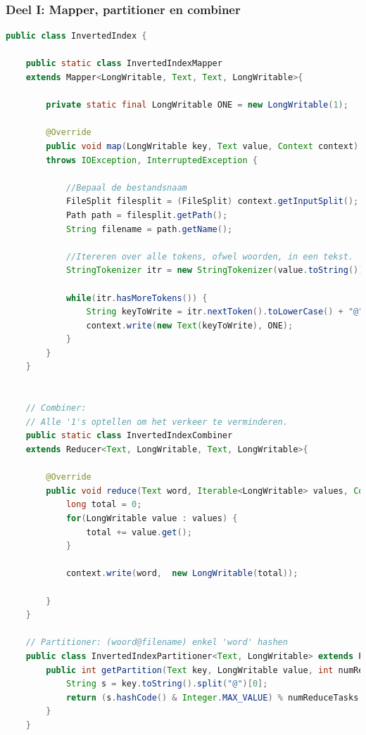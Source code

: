 \documentclass[a4paper,10pt,twoside]{report}
\begin{document}
\subsubsection{Deel I: Mapper, partitioner en combiner}
\begin{lstlisting}[language=Java]
public class InvertedIndex {
	
	public static class InvertedIndexMapper 
	extends Mapper<LongWritable, Text, Text, LongWritable>{
		
		private static final LongWritable ONE = new LongWritable(1);
		
		@Override
		public void map(LongWritable key, Text value, Context context) 
		throws IOException, InterruptedException {
			
			//Bepaal de bestandsnaam
			FileSplit filesplit = (FileSplit) context.getInputSplit();
			Path path = filesplit.getPath();
			String filename = path.getName();
			
			//Itereren over alle tokens, ofwel woorden, in een tekst.
			StringTokenizer itr = new StringTokenizer(value.toString());
			
			while(itr.hasMoreTokens()) {
				String keyToWrite = itr.nextToken().toLowerCase() + "@" + filename;
				context.write(new Text(keyToWrite), ONE);
			}
		}
	}
	
	
	// Combiner:
	// Alle '1's optellen om het verkeer te verminderen.
	public static class InvertedIndexCombiner
	extends Reducer<Text, LongWritable, Text, LongWritable>{
		
		@Override
		public void reduce(Text word, Iterable<LongWritable> values, Context context) throws IOException, InterruptedException{
			long total = 0;
			for(LongWritable value : values) {
				total += value.get();
			}
			
			context.write(word,  new LongWritable(total));
			
		}
	}
	
	// Partitioner: (woord@filename) enkel 'word' hashen
	public class InvertedIndexPartitioner<Text, LongWritable> extends Partitioner<Text, LongWritable>{
		public int getPartition(Text key, LongWritable value, int numReduceTasks) {
			String s = key.toString().split("@")[0];
			return (s.hashCode() & Integer.MAX_VALUE) % numReduceTasks;
		}
	}
	
\end{lstlisting}

\newpage
\end{document}
